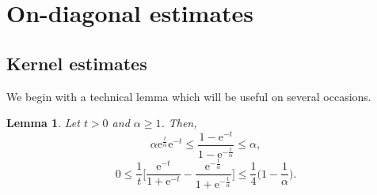 \documentclass[a4paper,oneside,10pt]{amsproc}
\theoremstyle{plain}
\newtheorem{lemma}{Lemma}
\theoremstyle{remark}
\renewcommand{\leq}{\leqslant}
\renewcommand{\leq}{\leqslant}
\renewcommand{\geq}{\geqslant}
\newcommand{\e}{\mathrm{e}} %
\renewcommand{\leq}{\leqslant}%
\renewcommand{\geq}{\geqslant}%
\begin{document}
\section{On-diagonal estimates}
\subsection{Kernel estimates}
We begin with a technical lemma which will be useful on several
occasions.
\begin{lemma}\label{lem:Time-part-Mehler-time-transform}
  Let $t > 0$ and $\alpha \geq 1$. Then,
  \begin{equation}
    \label{eq:Time-part-Mehler-time-transform-1}
    \alpha \e^{\frac{t}{\alpha}} \e^{-t} \leq \frac{1 -
      \e^{-t}}{1 - \e^{-\frac{t}{\alpha}}} \leq \alpha,
  \end{equation}
  \begin{equation}
    \label{eq:Time-part-Mehler-time-transform-2}
       0 \leq \frac1t \biggl[\frac{\e^{-t}}{1 + \e^{-t}} - \frac{\e^{-\frac{t}\alpha}}{1 +
         \e^{-\frac{t}{\alpha}}} \biggr] \leq \frac{1}{4} \biggl(1 -
       \frac1\alpha \biggr).
  \end{equation}
\end{lemma}
\end{document}
